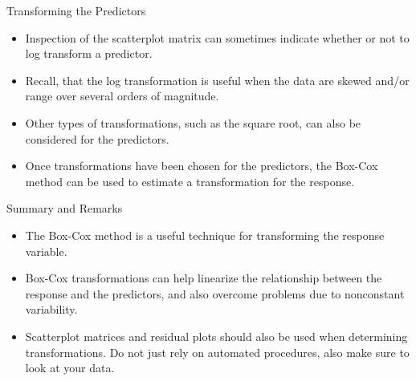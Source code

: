 \documentclass[10pt]{beamer}\usepackage[]{graphicx}\usepackage[]{color}
\begin{document}
\begin{frame}{Transforming the Predictors}
\begin{itemize}
\item Inspection of the scatterplot matrix can sometimes indicate whether or not to log transform a predictor.  
\vspace{5pt}
\item Recall, that the log transformation is useful when the data are skewed and/or range over several orders of magnitude.
\vspace{5pt}
\item Other types of transformations, such as the square root, can also be considered for the predictors.  
\vspace{5pt}
\item Once transformations have been chosen for the predictors, the Box-Cox method can be used to estimate a transformation for the response.
\end{itemize}
\end{frame}

\begin{frame}{Summary and Remarks}
\begin{itemize}
\item The Box-Cox method is a useful technique for transforming the response variable.
\vspace{5pt}
\item Box-Cox transformations can help linearize the relationship between the response and the predictors, and also overcome problems due to nonconstant variability.
\vspace{5pt}
\item Scatterplot matrices and residual plots should also be used when determining transformations.  Do not just rely on automated procedures, also make sure to look at your data.
\end{itemize}
\end{frame}
\end{document}
